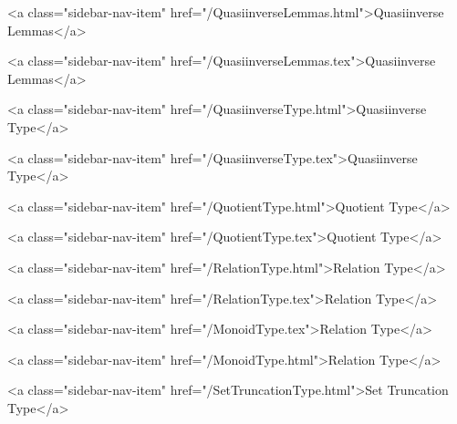       
        
          <a class="sidebar-nav-item" href="/QuasiinverseLemmas.html">Quasiinverse Lemmas</a>
        
      
    
      
        
          <a class="sidebar-nav-item" href="/QuasiinverseLemmas.tex">Quasiinverse Lemmas</a>
        
      
    
      
        
          <a class="sidebar-nav-item" href="/QuasiinverseType.html">Quasiinverse Type</a>
        
      
    
      
        
          <a class="sidebar-nav-item" href="/QuasiinverseType.tex">Quasiinverse Type</a>
        
      
    
      
        
          <a class="sidebar-nav-item" href="/QuotientType.html">Quotient Type</a>
        
      
    
      
        
          <a class="sidebar-nav-item" href="/QuotientType.tex">Quotient Type</a>
        
      
    
      
        
          <a class="sidebar-nav-item" href="/RelationType.html">Relation Type</a>
        
      
    
      
        
          <a class="sidebar-nav-item" href="/RelationType.tex">Relation Type</a>
        
      
    
      
        
          <a class="sidebar-nav-item" href="/MonoidType.tex">Relation Type</a>
        
      
    
      
        
          <a class="sidebar-nav-item" href="/MonoidType.html">Relation Type</a>
        
      
    
      
        
          <a class="sidebar-nav-item" href="/SetTruncationType.html">Set Truncation Type</a>
        
